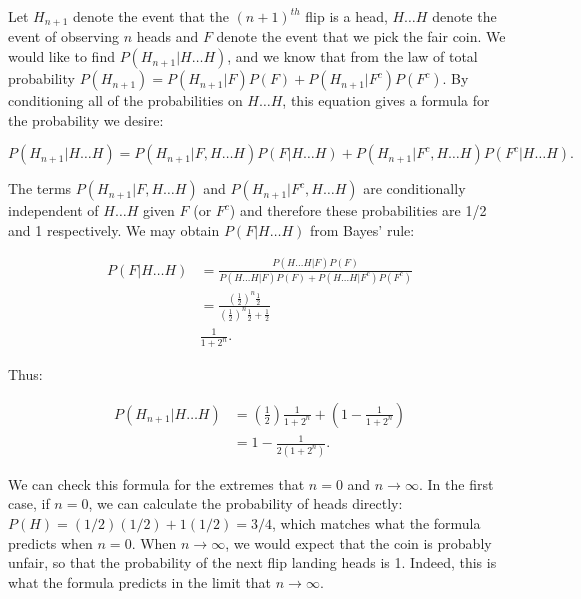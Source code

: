 \begin{problem}{36}  Let $H_{n+1}$ denote the event that the $(n+1)^{th}$ flip is a head, $H \ldots H$ denote the event of observing $n$ heads and $F$ denote the event that we pick the fair coin.  We would like to find $P(H_{n+1}|H \ldots H)$, and we know that from the law of total probability $P(H_{n+1}) = P(H_{n+1}|F)P(F)+P(H_{n+1}|F^c)P(F^c)$.  By conditioning all of the probabilities on $H \ldots H$, this equation gives a formula for the probability we desire:

\begin{equation}
P(H_{n+1}|H \ldots H) = P(H_{n+1}|F, H \ldots H)P(F|H \ldots H)+P(H_{n+1}|F^c, H \ldots H)P(F^c|H \ldots H).
\end{equation}

The terms  $P(H_{n+1}|F, H \ldots H)$ and $P(H_{n+1}|F^c, H \ldots H)$ are conditionally independent of $H \ldots H$ given $F$ (or $F^c$) and therefore these probabilities are 1/2 and 1 respectively.  We may obtain $P(F|H \ldots H)$ from Bayes' rule:

\begin{align*}
P(F|H \ldots H) &= \frac{P(H \ldots H|F)P(F)}{P(H \ldots H|F)P(F)+P(H \ldots H|F^c)P(F^c)} \\
& = \frac{\left (\frac{1}{2}\right)^n \frac{1}{2}}{\left (\frac{1}{2}\right)^n \frac{1}{2}+\frac{1}{2}} \\
& \frac{1}{1+2^n}.
\end{align*}

Thus:

\begin{align*}
P(H_{n+1}|H \ldots H) &= \left (\frac{1}{2} \right)\frac{1}{1+2^n}+\left (1-\frac{1}{1+2^n} \right) \\
& = 1-\frac{1}{2(1+2^n)}.
\end{align*}

We can check this formula for the extremes that $n=0$ and $n \rightarrow \infty$.  In the first case, if $n=0$, we can calculate the probability of heads directly: $P(H) = (1/2)(1/2)+1(1/2) = 3/4$, which matches what the formula predicts when $n=0$.  When $n \rightarrow \infty$, we would expect that the coin is probably unfair, so that the probability of the next flip landing heads is 1.  Indeed, this is what the formula predicts in the limit that $n \rightarrow \infty$.

\end{problem}




